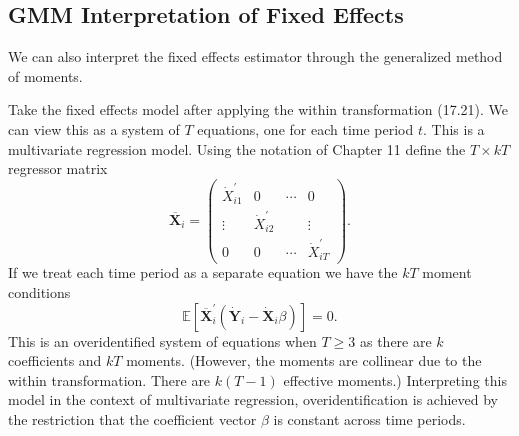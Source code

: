 \documentclass[10pt]{article}
\begin{document}
\subsection{GMM Interpretation of Fixed Effects}
We can also interpret the fixed effects estimator through the generalized method of moments.

Take the fixed effects model after applying the within transformation (17.21). We can view this as a system of $T$ equations, one for each time period $t$. This is a multivariate regression model. Using the notation of Chapter 11 define the $T \times k T$ regressor matrix
$$
\overline{\boldsymbol{X}}_{i}=\left(\begin{array}{cccc}
\dot{X}_{i 1}^{\prime} & 0 & \cdots & 0 \\
\vdots & \dot{X}_{i 2}^{\prime} & & \vdots \\
0 & 0 & \cdots & \dot{X}_{i T}^{\prime}
\end{array}\right) .
$$
If we treat each time period as a separate equation we have the $k T$ moment conditions
$$
\mathbb{E}\left[\overline{\boldsymbol{X}}_{i}^{\prime}\left(\dot{\boldsymbol{Y}}_{i}-\dot{\boldsymbol{X}}_{i} \beta\right)\right]=0 .
$$
This is an overidentified system of equations when $T \geq 3$ as there are $k$ coefficients and $k T$ moments. (However, the moments are collinear due to the within transformation. There are $k(T-1)$ effective moments.) Interpreting this model in the context of multivariate regression, overidentification is achieved by the restriction that the coefficient vector $\beta$ is constant across time periods.
\end{document}
